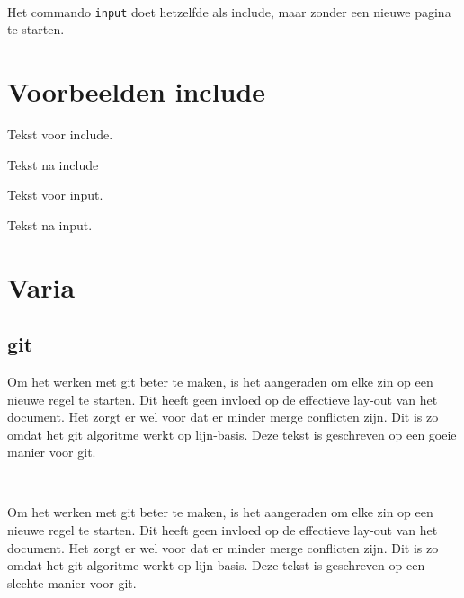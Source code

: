 \documentclass{article} %
\begin{document}
				\
				
				Het commando \texttt{input} doet hetzelfde als include, maar zonder een nieuwe pagina te starten.
				
	\section*{Voorbeelden include}
	
	Tekst voor include.			
	
	Tekst na include
	
	Tekst voor input.
	
	Tekst na input.
	
	
	\section{Varia}
		\subsection{git}
			Om het werken met git beter te maken, is het aangeraden om elke zin op een nieuwe regel te starten.
			Dit heeft geen invloed op de effectieve lay-out van het document.
			Het zorgt er wel voor dat er minder merge conflicten zijn.
			Dit is zo omdat het git algoritme werkt op lijn-basis.
			Deze tekst is geschreven op een goeie manier voor git.
			
			\
			
			
			Om het werken met git beter te maken, is het aangeraden om elke zin op een nieuwe regel te starten. Dit heeft geen invloed op de effectieve lay-out van het document. Het zorgt er wel voor dat er minder merge conflicten zijn. Dit is zo omdat het git algoritme werkt op lijn-basis. Deze tekst is geschreven op een slechte manier voor git.
							
\end{document}
